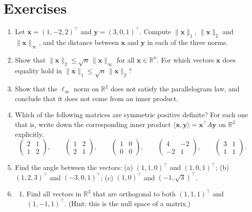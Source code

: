 \documentclass[11pt]{article}
\newcommand{\norm}[1]{\lVert #1 \rVert}
\newcommand{\ip}[2]{\langle #1, #2 \rangle}
\theoremstyle{definition}
\theoremstyle{plain}
\theoremstyle{remark}
\begin{document}
\section{Exercises}\label{sec:exercises}
\begin{enumerate}[leftmargin=*]
    \item Let $\mathbf{x} = (1, -2, 2)^\top$ and $\mathbf{y} = (3, 0, 1)^\top$. Compute $\norm{\mathbf{x}}_1$, $\norm{\mathbf{x}}_2$ and $\norm{\mathbf{x}}_\infty$, and the distance between $\mathbf{x}$ and $\mathbf{y}$ in each of the three norms.
    \item Show that $\norm{\mathbf{x}}_2 \leq \sqrt{n}\, \norm{\mathbf{x}}_\infty$ for all $\mathbf{x} \in \mathbb{R}^n$. For which vectors $\mathbf{x}$ does equality hold in $\norm{\mathbf{x}}_1 \leq \sqrt{n}\, \norm{\mathbf{x}}_2$?
    \item Show that the $\ell_\infty$ norm on $\mathbb{R}^2$ does not satisfy the parallelogram law, and conclude that it does not come from an inner product.
    \item Which of the following matrices are symmetric positive definite? For each one that is, write down the corresponding inner product $\ip{\mathbf{x}}{\mathbf{y}} = \mathbf{x}^\top A \mathbf{y}$ on $\mathbb{R}^2$ explicitly.
    \[\begin{pmatrix} 2 & 1 \\ 1 & 2 \end{pmatrix}, \qquad \begin{pmatrix} 1 & 2 \\ 2 & 1 \end{pmatrix}, \qquad \begin{pmatrix} 1 & 0 \\ 0 & 0 \end{pmatrix}, \qquad \begin{pmatrix} 4 & -2 \\ -2 & 1 \end{pmatrix}, \qquad \begin{pmatrix} 3 & 1 \\ 1 & 1 \end{pmatrix}.\]
    \item Find the angle between the vectors: (a) $(1, 1, 0)^\top$ and $(1, 0, 1)^\top$; (b) $(1, 2, 3)^\top$ and $(-3, 0, 1)^\top$; (c) $(1, 0)^\top$ and $(-1, \sqrt{3})^\top$.
    \item \begin{enumerate}[label=(\alph*)]
        \item Find all vectors in $\mathbb{R}^3$ that are orthogonal to both $(1, 1, 1)^\top$ and $(1, -1, 1)^\top$. (Hint: this is the null space of a matrix.)

\end{enumerate}
\end{enumerate}
\end{document}
